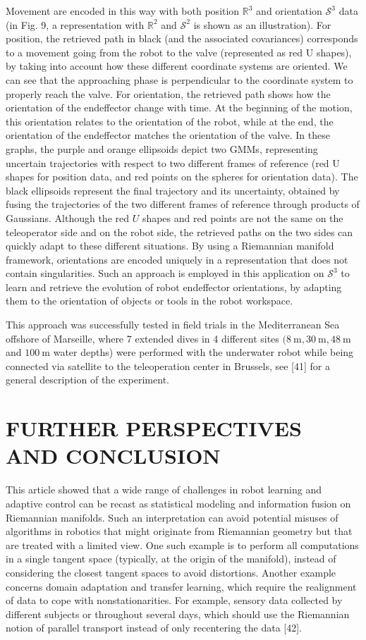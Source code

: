 \documentclass[10pt]{article}
\begin{document}
Movement are encoded in this way with both position $\mathbb{R}^{3}$ and orientation $\mathcal{S}^{3}$ data (in Fig. 9, a representation with $\mathbb{R}^{2}$ and $\mathcal{S}^{2}$ is shown as an illustration). For position, the retrieved path in black (and the associated covariances) corresponds to a movement going from the robot to the valve (represented as red U shapes), by taking into account how these different coordinate systems are oriented. We can see that the approaching phase is perpendicular to the coordinate system to properly reach the valve. For orientation, the retrieved path shows how the orientation of the endeffector change with time. At the beginning of the motion, this orientation relates to the orientation of the robot, while at the end, the orientation of the endeffector matches the orientation of the valve. In these graphs, the purple and orange ellipsoids depict two GMMs, representing uncertain trajectories with respect to two different frames of reference (red U shapes for position data, and red points on the spheres for orientation data). The black ellipsoids represent the final trajectory and its uncertainty, obtained by fusing the trajectories of the two different frames of reference through products of Gaussians. Although the red $U$ shapes and red points are not the same on the teleoperator side and on the robot side, the retrieved paths on the two sides can quickly adapt to these different situations. By using a Riemannian manifold framework, orientations are encoded uniquely in a representation that does not contain singularities. Such an approach is employed in this application on $\mathcal{S}^{3}$ to learn and retrieve the evolution of robot endeffector orientations, by adapting them to the orientation of objects or tools in the robot workspace.

This approach was successfully tested in field trials in the Mediterranean Sea offshore of Marseille, where 7 extended dives in 4 different sites $(8 \mathrm{~m}, 30 \mathrm{~m}, 48 \mathrm{~m}$ and $100 \mathrm{~m}$ water depths) were performed with the underwater robot while being connected via satellite to the teleoperation center in Brussels, see [41] for a general description of the experiment.

\section{FURTHER PERSPECTIVES AND CONCLUSION}
This article showed that a wide range of challenges in robot learning and adaptive control can be recast as statistical modeling and information fusion on Riemannian manifolds. Such an interpretation can avoid potential misuses of algorithms in robotics that might originate from Riemannian geometry but that are treated with a limited view. One such example is to perform all computations in a single tangent space (typically, at the origin of the manifold), instead of considering the closest tangent spaces to avoid distortions. Another example concerns domain adaptation and transfer learning, which require the realignment of data to cope with nonstationarities. For example, sensory data collected by different subjects or throughout several days, which should use the Riemannian notion of parallel transport instead of only recentering the data [42].
\end{document}
